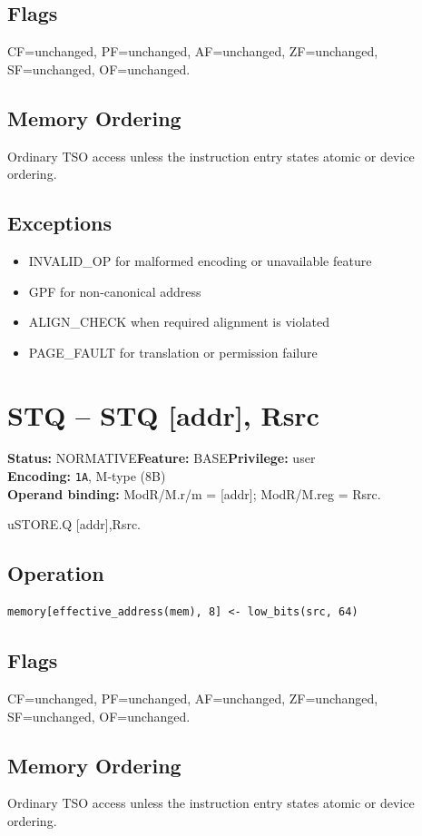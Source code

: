 \documentclass[10pt]{article}
\begin{document}
\subsection*{Flags}
CF=unchanged, PF=unchanged, AF=unchanged, ZF=unchanged, SF=unchanged, OF=unchanged.
\subsection*{Memory Ordering}
Ordinary TSO access unless the instruction entry states atomic or device ordering.
\subsection*{Exceptions}
\begin{itemize}
\item INVALID\_OP for malformed encoding or unavailable feature
\item GPF for non-canonical address
\item ALIGN\_CHECK when required alignment is violated
\item PAGE\_FAULT for translation or permission failure
\end{itemize}
\clearpage

\section{STQ -- STQ [addr], Rsrc}
\textbf{Status:} NORMATIVE\quad \textbf{Feature:} BASE\quad \textbf{Privilege:} user\\
\textbf{Encoding:} \texttt{1A}, M-type (8B)\\
\textbf{Operand binding:} ModR/M.r/m = [addr]; ModR/M.reg = Rsrc.

uSTORE.Q [addr],Rsrc.

\subsection*{Operation}
\begin{lstlisting}
memory[effective_address(mem), 8] <- low_bits(src, 64)
\end{lstlisting}
\subsection*{Flags}
CF=unchanged, PF=unchanged, AF=unchanged, ZF=unchanged, SF=unchanged, OF=unchanged.
\subsection*{Memory Ordering}
Ordinary TSO access unless the instruction entry states atomic or device ordering.
\end{document}

